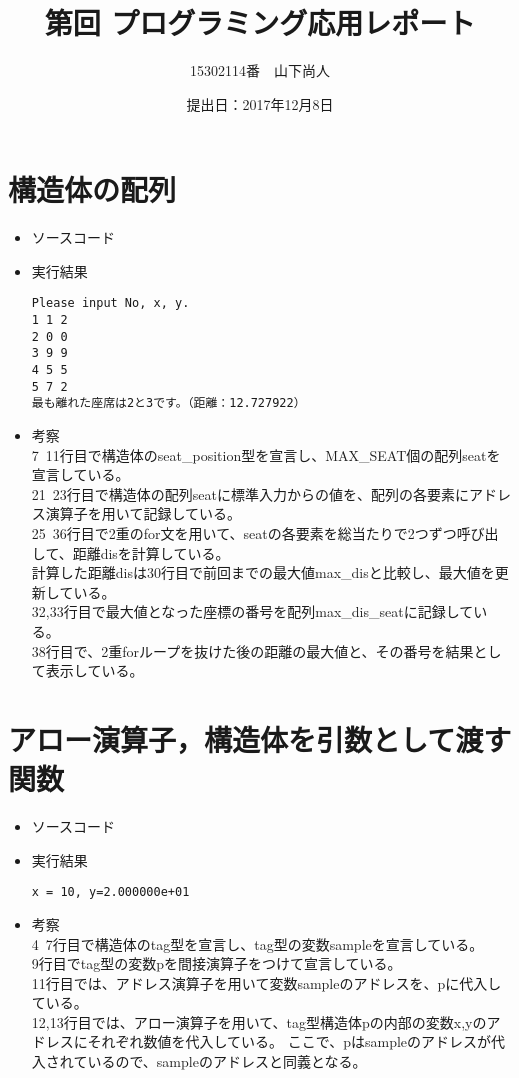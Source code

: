 \documentclass[a4paper]{jsarticle}
\title{第回 プログラミング応用レポート}
\author{15302114番　山下尚人}
\date{提出日：2017年12月8日}
\begin{document}
\maketitle%

\section{構造体の配列}
	\begin{itemize}
	\item ソースコード
		 
		\mbox{}\newline
	\item 実行結果
		\begin{lstlisting}
Please input No, x, y.
1 1 2
2 0 0
3 9 9
4 5 5
5 7 2
最も離れた座席は2と3です。（距離：12.727922）
		\end{lstlisting}
		\mbox{}\newline
	\item 考察\mbox{}\\
		7~11行目で構造体のseat\_position型を宣言し、MAX\_SEAT個の配列seatを宣言している。\\
		21~23行目で構造体の配列seatに標準入力からの値を、配列の各要素にアドレス演算子を用いて記録している。\\
		25~36行目で2重のfor文を用いて、seatの各要素を総当たりで2つずつ呼び出して、距離disを計算している。\\
		計算した距離disは30行目で前回までの最大値max\_disと比較し、最大値を更新している。\\
		32,33行目で最大値となった座標の番号を配列max\_dis\_seatに記録している。\\
		38行目で、2重forループを抜けた後の距離の最大値と、その番号を結果として表示している。\\
	\end{itemize}
	\newpage	%

\section{アロー演算子，構造体を引数として渡す関数}
	\begin{itemize}
	\item ソースコード
		 
		\mbox{}\newline
	\item 実行結果
		\begin{lstlisting}
x = 10, y=2.000000e+01
		\end{lstlisting}
		\mbox{}\newline
	\item 考察\mbox{}\\
		4~7行目で構造体のtag型を宣言し、tag型の変数sampleを宣言している。\\
		9行目でtag型の変数pを間接演算子をつけて宣言している。\\
		11行目では、アドレス演算子を用いて変数sampleのアドレスを、pに代入している。\\
		12,13行目では、アロー演算子を用いて、tag型構造体pの内部の変数x,yのアドレスにそれぞれ数値を代入している。
		ここで、pはsampleのアドレスが代入されているので、sampleのアドレスと同義となる。
	\end{itemize}
	\newpage	%
\end{document}
